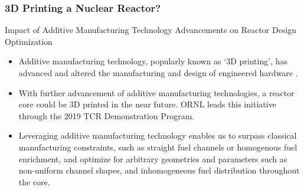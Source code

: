 \begin{frame}
    \frametitle{3D Printing a Nuclear Reactor?}
    \begin{block}{Impact of Additive Manufacturing Technology Advancements on 
        Reactor Design Optimization}
        \begin{itemize}
            \item Additive manufacturing technology, popularly known as `3D printing', 
            has advanced and altered the manufacturing and design of engineered hardware
            \cite{simpson_considerations_2019}. 
            \item With further advancement of additive manufacturing technologies, a reactor 
            core could be 3D printed in the near future. 
            \acrlong{ORNL} leads this initiative through the 2019 \acrlong{TCR} Demonstration 
            Program. 
            \item Leveraging additive manufacturing technology enables us to surpass classical 
            manufacturing constraints, such as straight fuel channels or homogenous fuel 
            enrichment, and optimize for arbitrary geometries and parameters 
            such as non-uniform channel shapes, and inhomogeneous fuel distribution 
            throughout the core. 
          \end{itemize}
    \end{block}
  \end{frame}


